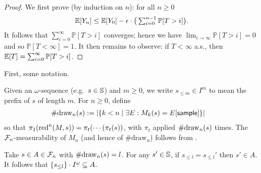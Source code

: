 
\rankPast*
\begin{proof}%
We first prove (by induction on $n$): for all $n \geq 0$
\[
\mathbb{E}[Y_n] \leq \mathbb{E}[Y_0] - \epsilon \cdot \big(\textstyle\sum_{i=0}^{n-1} \mathbb{P}[T > i]\big).
\]
It follows that $\sum_{i=0}^{\infty} \mathbb{P}[T > i]$ converges; hence we have $\lim_{i \to \infty} \mathbb{P}[T > i] = 0$ and so $\mathbb{P}[T < \infty] = 1$.
It then remains to observe: if $T < \infty$ a.s., then $\mathbb{E}[T] = \sum^\infty_{i=0} \mathbb{P}[T > i]$.
\end{proof}

\TechnicalRankingSupermartingale*

First, some notation.

Given an $\omega$-sequence (e.g.~$s \in {\mathbb{S}}$) and $m \geq 0$, we write $s_{\leq m} \in I^m$ to mean the prefix of $s$ of length $m$.
For $n \geq 0$, define
\begin{align*}
\#\mathrm{draw}_{n}(s) &:= |\{k < n \mid \exists E: M_k(s) = E[\mathsf{sample}]\}|
\end{align*}
so that $\pi_1 (\red^n(M, s)) = %
\pi_t( \cdots (\pi_t (s))$, with $\pi_t$ applied ${\#\mathrm{draw}_{n}(s)}$ times.
The $\mathcal{F}_n$-measurability of $M_n$ (and hence of $\#\mathrm{draw}_n$) follows from \citep{DBLP:conf/icfp/BorgstromLGS16}.
\iffalse
\akr{$\#\mathrm{draw}_n$ is not a stopping time. It doesn't look like you actually use this claim anyway, so it should just be fine to remove, but did you mean something different?} \lo{I agree, and I don't actually use this claim.}
\fi
Take $s \in A \in \mathcal{F}_n$ with $\#\mathrm{draw}_{n}(s) = l$.
For any $s'\in {\mathbb{S}}$, if $s_{\leq l} = s_{\leq l}'$ then $s' \in A$.
It follows that ${\{{s_{\leq l}}\} \cdot I^\omega} \subseteq A$.


